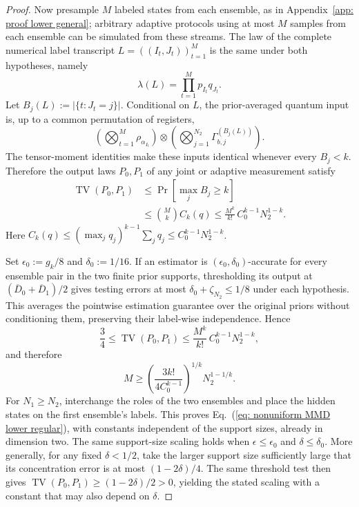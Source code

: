 \documentclass[aps,prx,reprint,superscriptaddress,amsmath,amssymb,longbibliography,floatfix]{revtex4-2}
\theoremstyle{plain}
\theoremstyle{definition}
\theoremstyle{remark}
\begin{document}
\begin{proof}
Now presample \(M\) labeled states from each ensemble, as in Appendix~\ref{app: proof lower general}; arbitrary adaptive protocols using at most \(M\) samples from each ensemble can be simulated from these streams. The law of the complete numerical label transcript \(L=((I_t,J_t))_{t=1}^M\) is the same under both hypotheses, namely
\[
    \lambda(L)=\prod_{t=1}^M p_{I_t}q_{J_t}.
\]
Let \(B_j(L):=|\{t:J_t=j\}|\). Conditional on \(L\), the prior-averaged quantum input is, up to a common permutation of registers,
\[
    \left(\bigotimes_{t=1}^M\rho_{\alpha_{I_t}}\right)
    \otimes\left(\bigotimes_{j=1}^{N_2}\Gamma_{b,j}^{(B_j(L))}\right).
\]
The tensor-moment identities make these inputs identical whenever every \(B_j<k\). Therefore the output laws \(P_0,P_1\) of any joint or adaptive measurement satisfy
\begin{equation}
\begin{aligned}
\operatorname{TV}(P_0,P_1)
    &\le\Pr\!\left[\max_j B_j\ge k\right]\\
    &\le\binom{M}{k}C_k(q)
    \le\frac{M^k}{k!}\,C_0^{k-1}N_2^{1-k}.
\end{aligned}
\label{eq:app-nonuniform-output-tv-bound}
\end{equation}
Here \(C_k(q)\le(\max_jq_j)^{k-1}\sum_jq_j\le C_0^{k-1}N_2^{1-k}\).

Set \(\epsilon_0:=g_k/8\) and \(\delta_0:=1/16\). If an estimator is \((\epsilon_0,\delta_0)\)-accurate for every ensemble pair in the two finite prior supports, thresholding its output at \((\overline D_0+\overline D_1)/2\) gives testing errors at most \(\delta_0+\zeta_{N_2}\le1/8\) under each hypothesis. This averages the pointwise estimation guarantee over the original priors without conditioning them, preserving their label-wise independence. Hence
\[
    \frac34\le\operatorname{TV}(P_0,P_1)
    \le\frac{M^k}{k!}\,C_0^{k-1}N_2^{1-k},
\]
and therefore
\begin{equation}
    M\ge\left(\frac{3k!}{4C_0^{k-1}}\right)^{1/k}N_2^{1-1/k}.
\label{eq:app-nonuniform-mmd-explicit-lower-bound}
\end{equation}
For \(N_1\ge N_2\), interchange the roles of the two ensembles and place the hidden states on the first ensemble's labels. This proves Eq.~(\ref{eq: nonuniform MMD lower regular}), with constants independent of the support sizes, already in dimension two. The same support-size scaling holds when \(\epsilon\le\epsilon_0\) and \(\delta\le\delta_0\). More generally, for any fixed \(\delta<1/2\), take the larger support size sufficiently large that its concentration error is at most \((1-2\delta)/4\). The same threshold test then gives \(\operatorname{TV}(P_0,P_1)\ge(1-2\delta)/2>0\), yielding the stated scaling with a constant that may also depend on \(\delta\).
\end{proof}
\end{document}
